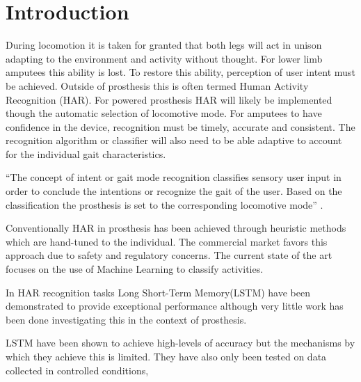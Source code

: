 
\section{Introduction} %
During locomotion it is taken for granted that both legs will act in unison adapting to the environment and activity without thought. For lower limb amputees this ability is lost. To restore this ability, perception of user intent must be achieved. Outside of prosthesis this is often termed Human Activity Recognition (HAR). For powered prosthesis HAR will likely be implemented though the automatic selection of locomotive mode\cite{Tucker2015, Windrich2016, Zhang2015}. For amputees to have confidence in the device, recognition must be timely, accurate and consistent\cite{Pedroli2019, Sinha2011}. The recognition algorithm or classifier will also need to be able adaptive to account for the individual gait characteristics\cite{Ponce2016}.

``The concept of intent or gait mode recognition classifies sensory user input in order to conclude the intentions or recognize the gait of the user. Based on the classification the prosthesis is set to the corresponding locomotive mode'' \cite{Windrich2016}. 

Conventionally HAR in prosthesis has been achieved through heuristic methods which are hand-tuned to the individual\cite{Maqbool2017, Xu2018}. The commercial market favors this approach due to safety and regulatory concerns\cite{Fluit2020}. The current state of the art focuses on the use of Machine Learning to classify activities\cite{Labarriere2020}.

In HAR recognition tasks Long Short-Term Memory(LSTM) have been demonstrated to provide exceptional performance\cite{Murad2017} although very little work has been done investigating this in the context of prosthesis\cite{Fluit2020}.

LSTM have been shown to achieve high-levels of accuracy but the mechanisms by which they achieve this is limited. They have also only been tested on data collected in controlled conditions,

